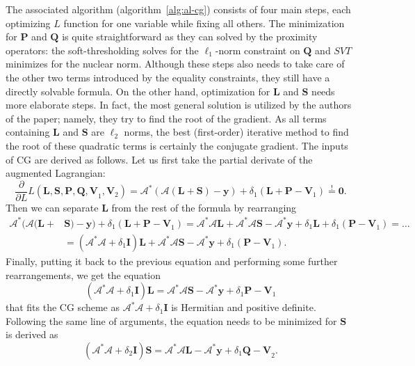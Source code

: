 The associated algorithm (algorithm~\ref{alg:al-cg}) consists of four main steps, each optimizing $L$ function for one variable while fixing all others. The minimization for $\mathbf{P}$ and $\mathbf{Q}$ is quite straightforward as they can solved by the proximity operators: the soft-thresholding solves for the $\ell_1$-norm constraint on $\mathbf{Q}$ and $SVT$ minimizes for the nuclear norm. Although these steps also needs to take care of the other two terms introduced by the equality constraints, they still have a directly solvable formula. On the other hand, optimization for $\mathbf{L}$ and $\mathbf{S}$ needs more elaborate steps. In fact, the most general solution is utilized by the authors of the paper; namely, they try to find the root of the gradient. As all terms containing $\mathbf{L}$ and $\mathbf{S}$ are $\ell_2$ norms, the best (first-order) iterative method to find the root of these quadratic terms is certainly the conjugate gradient. The inputs of CG are derived as follows. Let us first take the partial derivate of the augmented Lagrangian:
\[\frac{\partial}{\partial L} L(\mathbf{L, S, P, Q, V}_1, \mathbf{V}_2) = \mathcal{A}^*(\mathcal{A}(\mathbf{L} + \mathbf{S}) - \mathbf{y}) + \delta_1(\mathbf{L + P - V}_1) \overset{!}{=} \mathbf{0}.\]
Then we can separate $\mathbf{L}$ from the rest of the formula by rearranging
\begin{align*}
    \mathcal{A}^*(\mathcal{A}(\mathbf{L} + &\mathbf{S}) - \mathbf{y}) + \delta_1(\mathbf{L + P - V}_1) = \mathcal{A}^*\mathcal{A}\mathbf{L} + \mathcal{A}^*\mathcal{A}\mathbf{S} - \mathcal{A}^*\mathbf{y} + \delta_1\mathbf{L} + \delta_1(\mathbf{P - V}_1) = \ldots \\ & = (\mathcal{A}^*\mathcal{A} + \delta_1\mathbf{I})\mathbf{L} + \mathcal{A}^*\mathcal{A}\mathbf{S} - \mathcal{A}^*\mathbf{y} + \delta_1(\mathbf{P - V}_1).
\end{align*}
Finally, putting it back to the previous equation and performing some further rearrangements, we get the equation
\[(\mathcal{A}^*\mathcal{A} + \delta_1\mathbf{I})\mathbf{L} = \mathcal{A}^*\mathcal{A}\mathbf{S} - \mathcal{A}^*\mathbf{y} + \delta_1\mathbf{P - V}_1\]
that fits the CG scheme as $\mathcal{A}^*\mathcal{A} + \delta_1\mathbf{I}$ is Hermitian and positive definite. Following the same line of arguments, the equation needs to be minimized for $\mathbf{S}$ is derived as 
\[(\mathcal{A}^*\mathcal{A} + \delta_2\mathbf{I})\mathbf{S} = \mathcal{A}^*\mathcal{A}\mathbf{L} - \mathcal{A}^*\mathbf{y} + \delta_1\mathbf{Q - V}_2.\]

